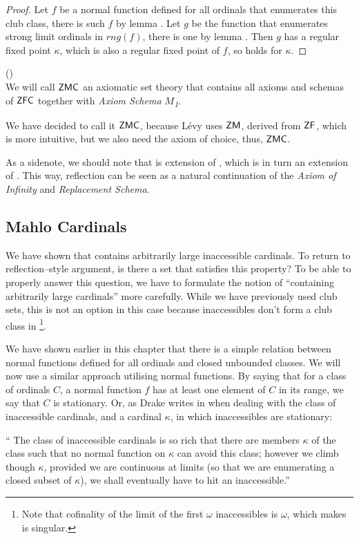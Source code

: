 \begin{proof}
Let $f$ be a normal function defined for all ordinals that enumerates this club class, there is such $f$ by lemma . 
Let $g$ be the function that enumerates strong limit ordinals in $rng(f)$, there is one by lemma . 
Then $g$ has a regular fixed point $\kappa$, which is also a regular fixed point of $f$, so  holds for $\kappa$.
\end{proof}

\begin{definition}{()}\\
We will call $\sf{ZMC}$ an axiomatic set theory that contains all axioms and schemas of $\sf{ZFC}$ together with \emph{Axiom Schema $M$\textsubscript{1}}.
\end{definition}
We have decided to call it $\sf{ZMC}$, because Lévy uses $\sf{ZM}$, derived from $\sf{ZF}$, which is more intuitive, but we also need the axiom of choice, thus, $\sf{ZMC}$.

As a sidenote, we should note that  is extension of , which is in turn an extension of . 
This way, reflection can be seen as a natural continuation of the \emph{Axiom of Infinity} and \emph{Replacement Schema}. %

\subsection{Mahlo Cardinals}
We have shown that  contains arbitrarily large inaccessible cardinals. To return to reflection–style argument, is there a set that satisfies this property? To be able to properly answer this question, we have to formulate the notion of ``containing arbitrarily large cardinals'' more carefully. While we have previously used club sets, this is not an option in this case because inaccessibles don't form a club class in \footnote{Note that cofinality of the limit of the first $\omega$ inaccessibles is $\omega$, which makes is singular.}. %

We have shown earlier in this chapter that there is a simple relation between normal functions defined for all ordinals and closed unbounded classes.
We will now use a similar approach utilising normal functions.
By saying that for a class of ordinals $C$, a normal function $f$ has at least one element of $C$ in its range, we say that $C$ is stationary. 
Or, as Drake writes in \cite{DrakeBook} when dealing with the class of inaccessible cardinals, and a cardinal $\kappa$, in which inaccessibles are stationary:
\begin{displayquote}
`` The class of inaccessible cardinals is so rich that there are members $\kappa$ of the class such that no normal function on $\kappa$ can avoid this class; however we climb though $\kappa$, provided we are continuous at limits (so that we are enumerating a closed subset of $\kappa$), we shall eventually have to hit an inaccessible.''
\end{displayquote}

